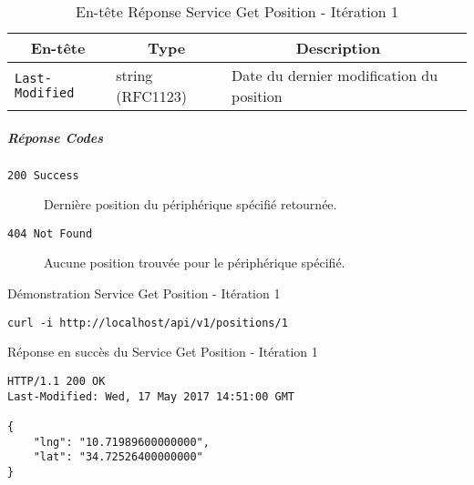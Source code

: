 \begin{table}[htbp]
    \centering
    \caption{En-tête Réponse Service Get Position - Itération 1}
    \begin{tabular}{|l | l | l | l|}
        \hline
        \multicolumn{1}{|c|}{\textbf{En-tête}} &
        \multicolumn{1}{c|}{\textbf{Type}} &
        \multicolumn{1}{c|}{\textbf{Description}} \\ \hline
        \verb|Last-Modified| & string (RFC1123) & Date du dernier modification du position \\ \hline
    \end{tabular}
\end{table}

\subparagraph*{Réponse Codes}
\begin{description}
    \item[\texttt{200 Success}] Dernière position du périphérique spécifié retournée.
    \item[\texttt{404 Not Found}] Aucune position trouvée pour le périphérique spécifié.
\end{description}

\begin{listing}
    \caption{Démonstration Service Get Position - Itération 1}
\begin{verbatim}
curl -i http://localhost/api/v1/positions/1
\end{verbatim}
\end{listing}

\begin{listing}[htbp]
    \caption{Réponse en succès du Service Get Position - Itération 1}
\begin{verbatim}
HTTP/1.1 200 OK
Last-Modified: Wed, 17 May 2017 14:51:00 GMT

{
    "lng": "10.71989600000000",
    "lat": "34.72526400000000"
}
\end{verbatim}
\end{listing}
